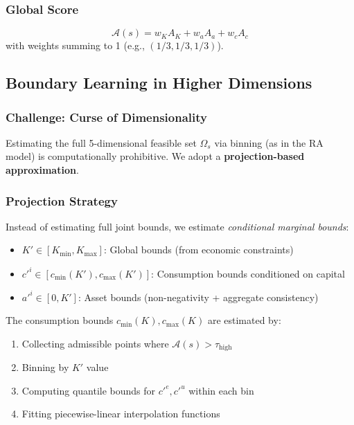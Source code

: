 \subsubsection{Global Score}
\begin{equation}
    \mathcal{A}(s) = w_K A_K + w_a A_a + w_c A_c
\end{equation}
with weights summing to 1 (e.g., $(1/3, 1/3, 1/3)$).


\subsection{Boundary Learning in Higher Dimensions}

\subsubsection{Challenge: Curse of Dimensionality}
Estimating the full 5-dimensional feasible set $\Omega_s$ via binning (as in the RA model) is computationally prohibitive. We adopt a \textbf{projection-based approximation}.

\subsubsection{Projection Strategy}
Instead of estimating full joint bounds, we estimate \textit{conditional marginal bounds}:
\begin{itemize}
    \item $K' \in [K_{\min}, K_{\max}]$: Global bounds (from economic constraints)
    \item $c'^i \in [c_{\min}(K'), c_{\max}(K')]$: Consumption bounds conditioned on capital
    \item $a'^i \in [0, K']$: Asset bounds (non-negativity + aggregate consistency)
\end{itemize}

The consumption bounds $c_{\min}(K), c_{\max}(K)$ are estimated by:
\begin{enumerate}
    \item Collecting admissible points where $\mathcal{A}(s) > \tau_{\text{high}}$
    \item Binning by $K'$ value
    \item Computing quantile bounds for $c'^e, c'^u$ within each bin
    \item Fitting piecewise-linear interpolation functions
\end{enumerate}

